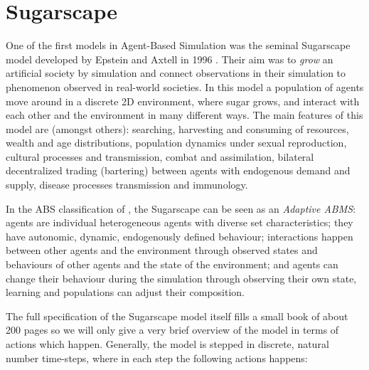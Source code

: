 \section{Sugarscape}
One of the first models in Agent-Based Simulation was the seminal Sugarscape model developed by Epstein and Axtell in 1996 \cite{epstein_growing_1996}. Their aim was to \textit{grow} an artificial society by simulation and connect observations in their simulation to phenomenon observed in real-world societies. In this model a population of agents move around in a discrete 2D environment, where sugar grows, and interact with each other and the environment in many different ways. The main features of this model are (amongst others): searching, harvesting and consuming of resources, wealth and age distributions, population dynamics under sexual reproduction, cultural processes and transmission, combat and assimilation, bilateral decentralized trading (bartering) between agents with endogenous demand and supply, disease processes transmission and immunology.

In the ABS classification of \cite{macal_everything_2016}, the Sugarscape can be seen as an \textit{Adaptive ABMS}: agents are individual heterogeneous agents with diverse set characteristics; they have autonomic, dynamic, endogenously defined behaviour; interactions happen between other agents and the environment through observed states and behaviours of other agents and the state of the environment; and agents can change their behaviour during the simulation through observing their own state, learning and populations can adjust their composition.

The full specification of the Sugarscape model itself fills a small book of about 200 pages so we will only give a very brief overview of the model in terms of actions which happen. Generally, the model is stepped in discrete, natural number time-steps, where in each step the following actions happens:

